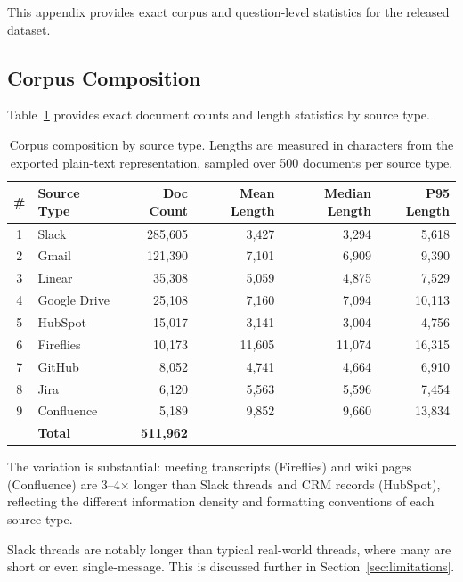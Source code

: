 \documentclass{article}
\begin{document}
This appendix provides exact corpus and question-level statistics for the released dataset.

\subsection{Corpus Composition}
\label{app:corpus}

Table~\ref{tab:corpus} provides exact document counts and length statistics by source type.

\begin{table}[t]
  \caption{Corpus composition by source type. Lengths are measured in characters from the exported plain-text representation, sampled over 500 documents per source type.}
  \label{tab:corpus}
  \centering
  \small
  \begin{tabular}{clrrrr}
    \toprule
    \# & Source Type   & Doc Count & Mean Length & Median Length & P95 Length \\
    \midrule
    1  & Slack         & 285,605 &  3,427 &  3,294 &  5,618 \\
    2  & Gmail         & 121,390 &  7,101 &  6,909 &  9,390 \\
    3  & Linear        &  35,308 &  5,059 &  4,875 &  7,529 \\
    4  & Google Drive  &  25,108 &  7,160 &  7,094 & 10,113 \\
    5  & HubSpot       &  15,017 &  3,141 &  3,004 &  4,756 \\
    6  & Fireflies     &  10,173 & 11,605 & 11,074 & 16,315 \\
    7  & GitHub        &   8,052 &  4,741 &  4,664 &  6,910 \\
    8  & Jira          &   6,120 &  5,563 &  5,596 &  7,454 \\
    9  & Confluence    &   5,189 &  9,852 &  9,660 & 13,834 \\
    \midrule
       & \textbf{Total} & \textbf{511,962} & & & \\
    \bottomrule
  \end{tabular}
\end{table}

The variation is substantial: meeting transcripts (Fireflies) and wiki pages (Confluence) are 3--4$\times$ longer than Slack threads and CRM records (HubSpot), reflecting the different information density and formatting conventions of each source type.

Slack threads are notably longer than typical real-world threads, where many are short or even single-message. This is discussed further in Section~\ref{sec:limitations}.
\end{document}
